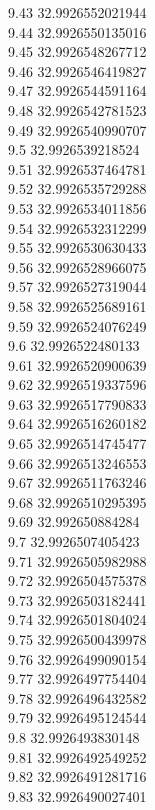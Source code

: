 {9.43	32.9926552021944\\
9.44	32.9926550135016\\
9.45	32.9926548267712\\
9.46	32.9926546419827\\
9.47	32.9926544591164\\
9.48	32.9926542781523\\
9.49	32.9926540990707\\
9.5	32.9926539218524\\
9.51	32.9926537464781\\
9.52	32.9926535729288\\
9.53	32.9926534011856\\
9.54	32.9926532312299\\
9.55	32.9926530630433\\
9.56	32.9926528966075\\
9.57	32.9926527319044\\
9.58	32.9926525689161\\
9.59	32.9926524076249\\
9.6	32.9926522480133\\
9.61	32.9926520900639\\
9.62	32.9926519337596\\
9.63	32.9926517790833\\
9.64	32.9926516260182\\
9.65	32.9926514745477\\
9.66	32.9926513246553\\
9.67	32.9926511763246\\
9.68	32.9926510295395\\
9.69	32.992650884284\\
9.7	32.9926507405423\\
9.71	32.9926505982988\\
9.72	32.9926504575378\\
9.73	32.9926503182441\\
9.74	32.9926501804024\\
9.75	32.9926500439978\\
9.76	32.9926499090154\\
9.77	32.9926497754404\\
9.78	32.9926496432582\\
9.79	32.9926495124544\\
9.8	32.9926493830148\\
9.81	32.9926492549252\\
9.82	32.9926491281716\\
9.83	32.9926490027401\\
}
